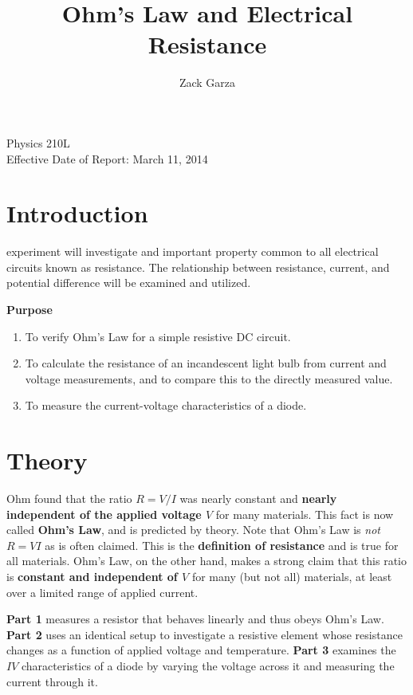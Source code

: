 \documentclass[twocolumn,english]{IEEEtran}
\theoremstyle{plain}
\theoremstyle{plain}
\begin{document}
\title{Ohm's Law and Electrical Resistance}


\author{Zack Garza}


\IEEEspecialpapernotice
{Physics 210L \\
Effective Date of Report: March 11, 2014 }


\maketitle
\tableofcontents

\section{Introduction}
 experiment will investigate and important property common to all electrical circuits known as resistance. The relationship between resistance, current, and potential difference will be examined and utilized.

\noindent\textbf{Purpose}
 \begin{enumerate}
  \item To verify Ohm's Law for a simple resistive DC circuit.
  \item To calculate the resistance of an incandescent light bulb from current and voltage measurements, and to compare this to the directly measured value.
  \item To measure the current-voltage characteristics of a diode.
 \end{enumerate}



\section{Theory}

Ohm found that the ratio $R=V/I$ was nearly constant and\textbf{ nearly independent of the applied voltage $V$} for many materials. This fact is now called\textbf{ Ohm's Law}, and is predicted by theory. Note that Ohm's Law is \textit{not} $R=VI$ as is often claimed. This is the \textbf{definition of resistance} and is true for all materials. Ohm's Law, on the other hand, makes a strong claim that this ratio is \textbf{constant and independent of $V$} for many (but not all) materials, at least over a limited range of applied current.

\textbf{Part 1} measures a resistor that behaves linearly and thus obeys Ohm's Law. \textbf{Part 2} uses an identical setup to investigate a resistive element whose resistance changes as a function of applied voltage and temperature. \textbf{Part 3} examines the $IV$ characteristics of a diode by varying the voltage across it and measuring the current through it.
\end{document}
